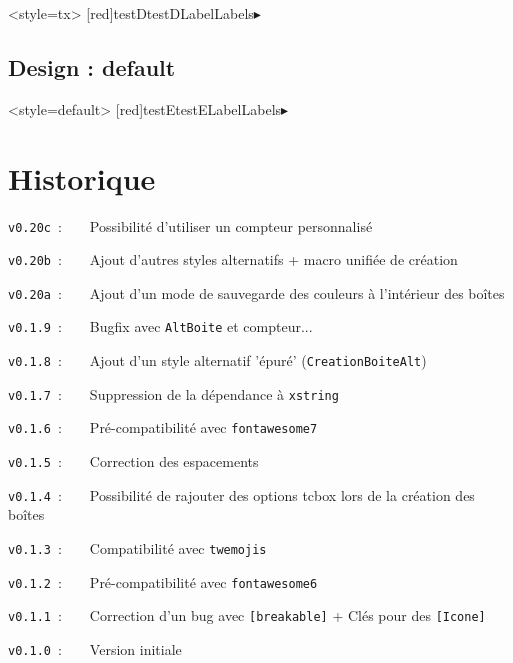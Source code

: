 \documentclass[french,11pt,a4paper]{article}
\begin{document}
\begin{demohigh}[language=latex/latex2,style/main=cyan!10,style/code=cyan!10]
\GenereBoite<style=tx>%
  [red]{testD}{testD}{Label}{Labels}{$\blacktriangleright$\,}

\begin{testD}
\lipsum[1][1-5]
\end{testD}
\end{demohigh}

\subsection{Design : default}

\begin{demohigh}[language=latex/latex2,style/main=cyan!10,style/code=cyan!10]
\GenereBoite<style=default>%
  [red]{testE}{testE}{Label}{Labels}{$\blacktriangleright$\,}

\begin{testE}
\lipsum[1][1-5]
\end{testE}
\end{demohigh}

\pagebreak

\section{Historique}

\verb|v0.20c|~:~~~~Possibilité d'utiliser un compteur personnalisé

\verb|v0.20b|~:~~~~Ajout d'autres styles alternatifs + macro unifiée de création

\verb|v0.20a|~:~~~~Ajout d'un mode de sauvegarde des couleurs à l'intérieur des boîtes

\verb|v0.1.9|~:~~~~Bugfix avec \texttt{AltBoite} et compteur...

\verb|v0.1.8|~:~~~~Ajout d'un style alternatif 'épuré' (\texttt{CreationBoiteAlt})

\verb|v0.1.7|~:~~~~Suppression de la dépendance à \texttt{xstring}

\verb|v0.1.6|~:~~~~Pré-compatibilité avec \texttt{fontawesome7}

\verb|v0.1.5|~:~~~~Correction des espacements

\verb|v0.1.4|~:~~~~Possibilité de rajouter des options \textsf{tcbox} lors de la création des boîtes

\verb|v0.1.3|~:~~~~Compatibilité avec \texttt{twemojis}

\verb|v0.1.2|~:~~~~Pré-compatibilité avec \texttt{fontawesome6}

\verb|v0.1.1|~:~~~~Correction d'un bug avec \texttt{[breakable]} + Clés pour des \texttt{[Icone]}

\verb|v0.1.0|~:~~~~Version initiale

\vspace*{15mm}

\pagebreak
\end{document}

